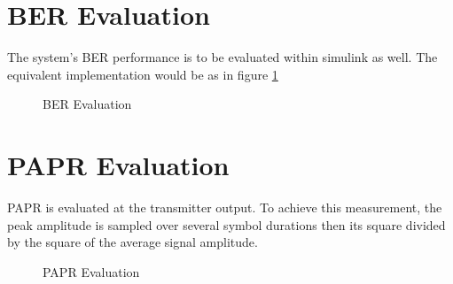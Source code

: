 \section{\gls{BER} Evaluation}
The system's \gls{BER} performance is to be evaluated within \gls{simulink} as well. The equivalent implementation would be as in figure \ref{fig:ber_blk_meth}
\begin{figure}[htpb!]
	\centerline{\resizebox{15cm}{!}{}}
	\caption{\gls{BER} Evaluation}
	\label{fig:ber_blk_meth}
\end{figure}

\section{\gls{PAPR} Evaluation}
\gls{PAPR} is evaluated at the transmitter output. To achieve this measurement, the peak amplitude is sampled over several symbol durations then its square divided by the square of the average signal amplitude.
\begin{figure}[htpb!]
	\centerline{\resizebox{10cm}{!}{}}
	\caption{\gls{PAPR} Evaluation}
	\label{fig:papr_blk_meth}
\end{figure}